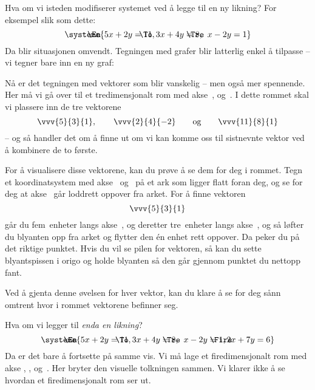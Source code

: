Hva om vi isteden modifiserer systemet ved å legge til en ny likning?
For eksempel slik som dette:
\[
\systeme{
\makebox[0pt][l]{\hspace{-2em}\En}  5x + 2y = 11,
\makebox[0pt][l]{\hspace{-2em}\To}  3x + 4y = 8,
\makebox[0pt][l]{\hspace{-2em}\Tre} \phantom{3}x - 2y = 1
}
\]
Da blir situasjonen omvendt.  Tegningen med grafer blir latterlig
enkel å tilpasse -- vi tegner bare inn en ny graf:
\begin{center}
\end{center}
Nå er det tegningen med vektorer som blir vanskelig -- men også mer
spennende.  Her må vi gå over til et tredimensjonalt rom med akse~\En,
\To{} og~\Tre.  I dette rommet skal vi plassere inn de tre vektorene
\[
\vvv{5}{3}{1},\qquad
\vvv{2}{4}{-2}\qquad\text{og}\qquad
\vvv{11}{8}{1}
\]
-- og så handler det om å finne ut om vi kan komme oss til sistnevnte
vektor ved å kombinere de to første.

For å visualisere disse vektorene, kan du prøve å se dem for deg i
rommet.  Tegn et koordinatsystem med akse~\En{} og~\To{} på et ark som
ligger flatt foran deg, og se for deg at akse~\Tre{} går loddrett
oppover fra arket.  For å finne vektoren
\[
\vvv{5}{3}{1}
\]
går du fem~enheter langs akse~\En, og deretter tre~enheter langs
akse~\To, og så løfter du blyanten opp fra arket og flytter den én
enhet rett oppover.  Da peker du på det riktige punktet.  Hvis du vil
se pilen for vektoren, så kan du sette blyantspissen i origo og holde
blyanten så den går gjennom punktet du nettopp fant.

Ved å gjenta denne øvelsen for hver vektor, kan du klare å se for deg
sånn omtrent hvor i rommet vektorene befinner seg.

\smallskip
Hva om vi legger til \emph{enda en likning}?
\[
\systeme{
\makebox[0pt][l]{\hspace{-2em}\En}   5x + 2y = 11,
\makebox[0pt][l]{\hspace{-2em}\To}   3x + 4y = 8,
\makebox[0pt][l]{\hspace{-2em}\Tre}  \phantom{3}x - 2y = 1,
\makebox[0pt][l]{\hspace{-2em}\Fire} 2x + 7y = 6
}
\]
Da er det bare å fortsette på samme vis.  Vi må lage et
firedimensjonalt rom med akse \En, \To, \Tre{} og~\Fire.  Her bryter
den visuelle tolkningen sammen.  Vi klarer ikke å se hvordan et
firedimensjonalt rom ser ut.

